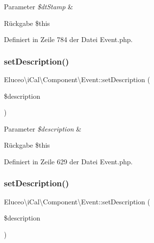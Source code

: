 \begin{DoxyParams}{Parameter}
{\em \$dt\+Stamp} & \\
\hline
\end{DoxyParams}
\begin{DoxyReturn}{Rückgabe}
\$this 
\end{DoxyReturn}


Definiert in Zeile 784 der Datei Event.\+php.

\mbox{\label{class_eluceo_1_1i_cal_1_1_component_1_1_event_a508fb1d58b995b1864d8b02102ae3a93}} 
\subsubsection{\texorpdfstring{set\+Description()}{setDescription()}\hspace{0.1cm}{\footnotesize\ttfamily [1/3]}}
{\footnotesize\ttfamily Eluceo\textbackslash{}i\+Cal\textbackslash{}\+Component\textbackslash{}\+Event\+::set\+Description (\begin{DoxyParamCaption}\item[{}]{\$description }\end{DoxyParamCaption})}


\begin{DoxyParams}{Parameter}
{\em \$description} & \\
\hline
\end{DoxyParams}
\begin{DoxyReturn}{Rückgabe}
\$this 
\end{DoxyReturn}


Definiert in Zeile 629 der Datei Event.\+php.

\mbox{\label{class_eluceo_1_1i_cal_1_1_component_1_1_event_a508fb1d58b995b1864d8b02102ae3a93}} 
\subsubsection{\texorpdfstring{set\+Description()}{setDescription()}\hspace{0.1cm}{\footnotesize\ttfamily [2/3]}}
{\footnotesize\ttfamily Eluceo\textbackslash{}i\+Cal\textbackslash{}\+Component\textbackslash{}\+Event\+::set\+Description (\begin{DoxyParamCaption}\item[{}]{\$description }\end{DoxyParamCaption})}


